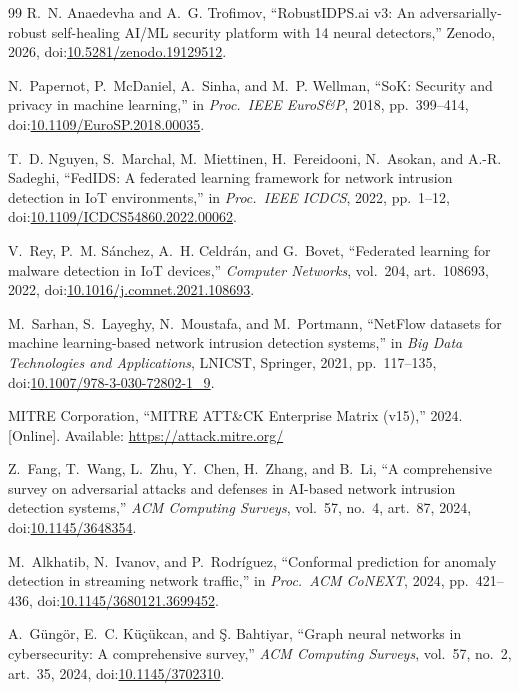 \documentclass{ieeeaccess}
\begin{document}
\begin{thebibliography}{99}
R.~N. Anaedevha and A.~G. Trofimov,
``RobustIDPS.ai v3: An adversarially-robust self-healing AI/ML security
platform with 14 neural detectors,'' Zenodo, 2026,
doi:\href{https://doi.org/10.5281/zenodo.19129512}{10.5281/zenodo.19129512}.

N.~Papernot, P.~McDaniel, A.~Sinha, and M.~P. Wellman,
``SoK: Security and privacy in machine learning,''
in \emph{Proc.\ IEEE EuroS\&P}, 2018, pp.~399--414,
doi:\href{https://doi.org/10.1109/EuroSP.2018.00035}{10.1109/EuroSP.2018.00035}.

T.~D. Nguyen, S.~Marchal, M.~Miettinen, H.~Fereidooni, N.~Asokan, and
A.-R. Sadeghi,
``FedIDS: A federated learning framework for network intrusion detection
in IoT environments,''
in \emph{Proc.\ IEEE ICDCS}, 2022, pp.~1--12,
doi:\href{https://doi.org/10.1109/ICDCS54860.2022.00062}{10.1109/ICDCS54860.2022.00062}.

V.~Rey, P.~M. S\'{a}nchez, A.~H. Celdr\'{a}n, and G.~Bovet,
``Federated learning for malware detection in IoT devices,''
\emph{Computer Networks}, vol.~204, art.~108693, 2022,
doi:\href{https://doi.org/10.1016/j.comnet.2021.108693}{10.1016/j.comnet.2021.108693}.

M.~Sarhan, S.~Layeghy, N.~Moustafa, and M.~Portmann,
``NetFlow datasets for machine learning-based network intrusion
detection systems,''
in \emph{Big Data Technologies and Applications}, LNICST, Springer, 2021,
pp.~117--135,
doi:\href{https://doi.org/10.1007/978-3-030-72802-1_9}{10.1007/978-3-030-72802-1\_9}.

MITRE Corporation,
``MITRE ATT\&CK Enterprise Matrix (v15),'' 2024. [Online]. Available:
\url{https://attack.mitre.org/}

Z.~Fang, T.~Wang, L.~Zhu, Y.~Chen, H.~Zhang, and B.~Li,
``A comprehensive survey on adversarial attacks and defenses in AI-based
network intrusion detection systems,''
\emph{ACM Computing Surveys}, vol.~57, no.~4, art.~87, 2024,
doi:\href{https://doi.org/10.1145/3648354}{10.1145/3648354}.

M.~Alkhatib, N.~Ivanov, and P.~Rodr\'{i}guez,
``Conformal prediction for anomaly detection in streaming network
traffic,''
in \emph{Proc.\ ACM CoNEXT}, 2024, pp.~421--436,
doi:\href{https://doi.org/10.1145/3680121.3699452}{10.1145/3680121.3699452}.

A.~G\"{u}ng\"{o}r, E.~C. K\"{u}\c{c}\"{u}kcan, and \c{S}. Bahtiyar,
``Graph neural networks in cybersecurity: A comprehensive survey,''
\emph{ACM Computing Surveys}, vol.~57, no.~2, art.~35, 2024,
doi:\href{https://doi.org/10.1145/3702310}{10.1145/3702310}.


\end{thebibliography}
\end{document}
